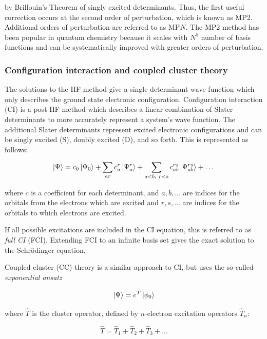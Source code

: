 \noindent by Brillouin's Theorem of singly excited determinants. Thus, the first
useful correction occurs at the second order of perturbation, which is known as
MP2. Additional orders of perturbation are referred to as MP$N$. The MP2 method
has been popular in quantum chemistry because it scales with $N^5$ number of
basis functions and can be systematically improved with greater orders of
perturbation.

\subsubsection{Configuration interaction and coupled cluster theory}

The solutions to the HF method give a single determinant wave function which
only describes the ground state electronic configuration. Configuration
interaction (CI) is a post-HF method which describes a linear combination of
Slater determinants to more accurately represent a system's wave function. The
additional Slater determinants represent excited electronic configurations and
can be singly excited (S), doubly excited (D), and so forth. This is represented
as follows:

\begin{equation}
  \ket{\Psi} = c_0 \ket{\Psi_0} + \sum_{ar}c_a^r \ket{\Psi_a^r} + \sum_{a<b,~r<s} c_{ab}^{rs} \ket{\Psi_{ab}^{rs}}+\dots
\end{equation}

\noindent where $c$ is a coefficient for each determinant, and $a, b, \dots$ are
indices for the orbitals from the electrons which are excited and $r, s, \dots$
are indices for the orbitals to which electrons are excited.

If all possible excitations are included in the CI equation, this is referred to
as \emph{full CI} (FCI). Extending FCI to an infinite basis set gives the exact
solution to the Schr{\"o}dinger equation.

Coupled cluster (CC) theory\cite{Crawford2000} is a similar approach to CI, but
uses the so-called \emph{exponential ansatz}

\begin{equation}
  \ket{\Psi} = e^{\hat{T}}\ket{\phi_0}
\end{equation}

\noindent where $\hat{T}$ is the cluster operator, defined by $n$-electron
excitation operators $\hat{T}_n$:

\begin{equation}
  \hat{T} = \hat{T}_1 + \hat{T}_2 + \hat{T}_3 + \dots
\end{equation}

